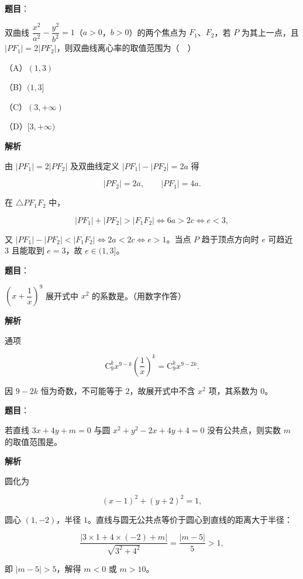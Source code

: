 \begin{answer}

\textbf{题目}：

双曲线 $\dfrac{x^2}{a^2}-\dfrac{y^2}{b^2}=1$（$a>0$，$b>0$）的两个焦点为 $F_1$、$F_2$，若 $P$ 为其上一点，且 $|PF_1|=2|PF_2|$，则双曲线离心率的取值范围为（　）

（A）$(1,3)$

（B）$(1,3]$

（C）$(3,+\infty)$

（D）$[3,+\infty)$

\textbf{解析}

由 $|PF_1|=2|PF_2|$ 及双曲线定义 $|PF_1|-|PF_2|=2a$ 得

\nopagebreak[4]
\[|PF_2|=2a,\qquad |PF_1|=4a.\]

在 $\triangle PF_1F_2$ 中，

\nopagebreak[4]
\[|PF_1|+|PF_2|>|F_1F_2|\iff 6a>2c\iff e<3,\]

又 $|PF_1|-|PF_2|<|F_1F_2|\iff 2a<2c\iff e>1$。当点 $P$ 趋于顶点方向时 $e$ 可趋近 $3$ 且能取到 $e=3$，故 $e\in(1,3]$。


\end{answer}
\begin{answer}

\textbf{题目}：

$\left(x+\dfrac1x\right)^9$ 展开式中 $x^2$ 的系数是\gkblank{}。（用数字作答）

\textbf{解析}

通项

\nopagebreak[4]
\[\mathrm C_9^kx^{9-k}\left(\frac1x\right)^k=\mathrm C_9^kx^{9-2k}.\]

因 $9-2k$ 恒为奇数，不可能等于 $2$，故展开式中不含 $x^2$ 项，其系数为 $0$。


\end{answer}
\begin{answer}

\textbf{题目}：

若直线 $3x+4y+m=0$ 与圆 $x^2+y^2-2x+4y+4=0$ 没有公共点，则实数 $m$ 的取值范围是\gkblank{}。

\textbf{解析}

圆化为

\nopagebreak[4]
\[(x-1)^2+(y+2)^2=1,\]

圆心 $(1,-2)$，半径 $1$。直线与圆无公共点等价于圆心到直线的距离大于半径：

\nopagebreak[4]
\[\frac{|3\times1+4\times(-2)+m|}{\sqrt{3^2+4^2}}=\frac{|m-5|}5>1,\]

即 $|m-5|>5$，解得 $m<0$ 或 $m>10$。


\end{answer}
